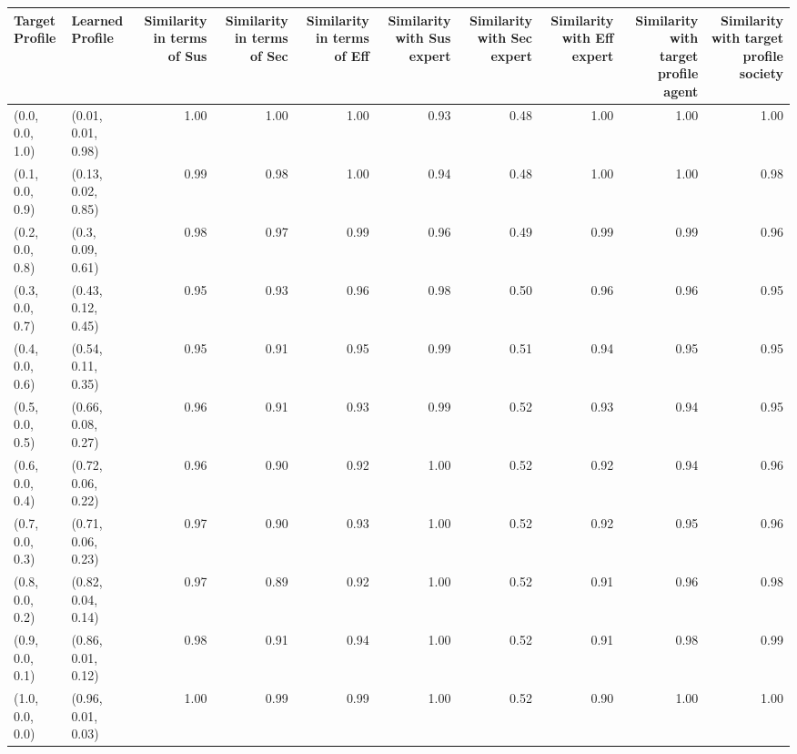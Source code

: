 \begin{tabular}{llrrrrrrrr}
\toprule
Target Profile & Learned Profile & Similarity in terms of Sus & Similarity in terms of Sec & Similarity in terms of Eff & Similarity with Sus expert & Similarity with Sec expert & Similarity with Eff expert & Similarity with target profile agent & Similarity with target profile society \\
\midrule
(0.0, 0.0, 1.0) & (0.01, 0.01, 0.98) & 1.00 & 1.00 & 1.00 & 0.93 & 0.48 & 1.00 & 1.00 & 1.00 \\
(0.1, 0.0, 0.9) & (0.13, 0.02, 0.85) & 0.99 & 0.98 & 1.00 & 0.94 & 0.48 & 1.00 & 1.00 & 0.98 \\
(0.2, 0.0, 0.8) & (0.3, 0.09, 0.61) & 0.98 & 0.97 & 0.99 & 0.96 & 0.49 & 0.99 & 0.99 & 0.96 \\
(0.3, 0.0, 0.7) & (0.43, 0.12, 0.45) & 0.95 & 0.93 & 0.96 & 0.98 & 0.50 & 0.96 & 0.96 & 0.95 \\
(0.4, 0.0, 0.6) & (0.54, 0.11, 0.35) & 0.95 & 0.91 & 0.95 & 0.99 & 0.51 & 0.94 & 0.95 & 0.95 \\
(0.5, 0.0, 0.5) & (0.66, 0.08, 0.27) & 0.96 & 0.91 & 0.93 & 0.99 & 0.52 & 0.93 & 0.94 & 0.95 \\
(0.6, 0.0, 0.4) & (0.72, 0.06, 0.22) & 0.96 & 0.90 & 0.92 & 1.00 & 0.52 & 0.92 & 0.94 & 0.96 \\
(0.7, 0.0, 0.3) & (0.71, 0.06, 0.23) & 0.97 & 0.90 & 0.93 & 1.00 & 0.52 & 0.92 & 0.95 & 0.96 \\
(0.8, 0.0, 0.2) & (0.82, 0.04, 0.14) & 0.97 & 0.89 & 0.92 & 1.00 & 0.52 & 0.91 & 0.96 & 0.98 \\
(0.9, 0.0, 0.1) & (0.86, 0.01, 0.12) & 0.98 & 0.91 & 0.94 & 1.00 & 0.52 & 0.91 & 0.98 & 0.99 \\
(1.0, 0.0, 0.0) & (0.96, 0.01, 0.03) & 1.00 & 0.99 & 0.99 & 1.00 & 0.52 & 0.90 & 1.00 & 1.00 \\
\bottomrule
\end{tabular}

